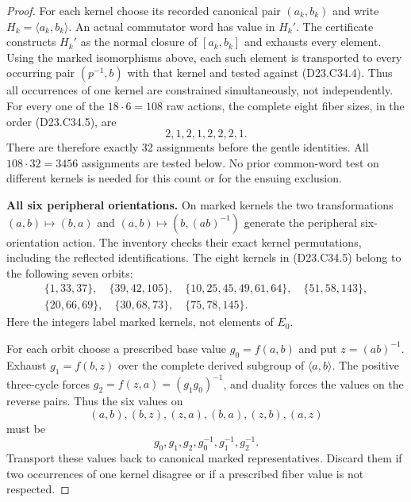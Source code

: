 \begin{proof}
For each kernel choose its recorded canonical pair
$(a_k,b_k)$ and write $H_k=\langle a_k,b_k\rangle$.
An actual commutator word has value in $H_k'$.
The certificate constructs $H_k'$ as the normal
closure of $[a_k,b_k]$ and exhausts every element.
Using the marked isomorphisms above, each such
element is transported to every occurring pair
$(p^{-1},b)$ with that kernel and tested against
(D23.C34.4).  Thus all occurrences of one kernel
are constrained simultaneously, not independently.
For every one of the $18\cdot6=108$ raw actions,
the complete eight fiber sizes, in the order
(D23.C34.5), are
\[
                         2,1,2,1,2,2,2,1.
\]
There are therefore exactly 32 assignments before
the gentle identities.  All $108\cdot32=3456$
assignments are tested below.  No prior common-word
test on different kernels is needed for this count
or for the ensuing exclusion.

\textbf{All six peripheral orientations.}\quad
On marked kernels the two transformations
$(a,b)\mapsto(b,a)$ and
$(a,b)\mapsto(b,(ab)^{-1})$ generate the peripheral
six-orientation action.  The inventory checks their
exact kernel permutations, including the reflected
identifications.  The eight kernels in (D23.C34.5)
belong to the following seven orbits:
\[
\begin{gathered}
\{1,33,37\},\quad\{39,42,105\},\quad
\{10,25,45,49,61,64\},\quad\{51,58,143\},\\
\{20,66,69\},\quad\{30,68,73\},\quad\{75,78,145\}.
\end{gathered}                                               \tag{D23.C34.6}
\]
Here the integers label marked kernels, not elements
of $E_0$.

For each orbit choose a prescribed base value
$g_0=f(a,b)$ and put $z=(ab)^{-1}$.
Exhaust $g_1=f(b,z)$ over the complete derived
subgroup of $\langle a,b\rangle$.
The positive three-cycle forces
$g_2=f(z,a)=(g_1g_0)^{-1}$, and duality forces the
values on the reverse pairs.  Thus the six values on
\[
 (a,b),(b,z),(z,a),(b,a),(z,b),(a,z)
\]
must be
\[
               g_0,g_1,g_2,g_0^{-1},g_1^{-1},g_2^{-1}.
                                                               \tag{D23.C34.7}
\]
Transport these values back to canonical marked
representatives.  Discard them if two occurrences
of one kernel disagree or if a prescribed fiber
value is not respected.


\end{proof}
